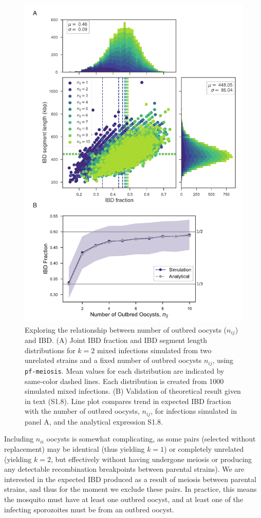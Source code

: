 \documentclass[9pt,lineno]{elife}
\begin{document}
\begin{figure}[pt]
  \centering{}
  \includegraphics[width = .85\textwidth]{supFigures/supp-Fig1.pdf}
  \caption{Exploring the relationship between number of outbred oocysts ($n_{ij}$) and IBD. (A) Joint IBD fraction and IBD segment length distributions for $k=2$ mixed infections simulated from two unrelated strains and a fixed number of outbred oocysts $n_{ij}$, using \texttt{pf-meiosis}. Mean values for each distribution are indicated by same-color dashed lines. Each distribution is created from 1000 simulated mixed infections. (B) Validation of theoretical result given in text (S1.8). Line plot compares trend in expected IBD fraction with the number of outbred oocysts, $n_{ij}$, for infections simulated in panel A, and the analytical expression S1.8.} \label{fig:validoocyst}
\end{figure}

Including $n_{ii}$ oocysts is somewhat complicating, as some pairs (selected without replacement) may be identical (thus yielding $k=1$) or completely unrelated (yielding $k=2$, but effectively without having undergone meiosis or producing any detectable recombination breakpoints between parental strains).  We are interested in the expected IBD produced as a result of meiosis between parental strains, and thus for the moment we exclude these pairs. In practice, this means the mosquito must have at least one outbred oocyst, and at least one of the infecting sporozoites must be from an outbred oocyst.
\end{document}
